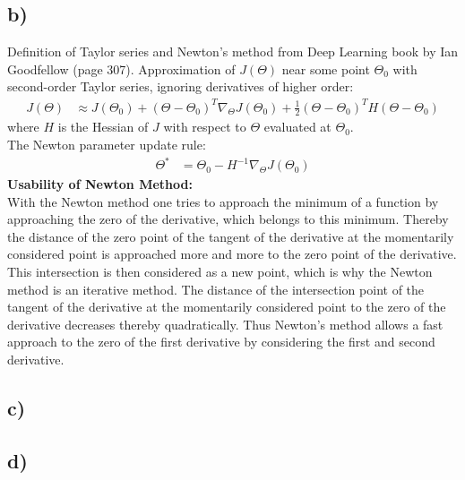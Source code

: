 \documentclass[a4paper]{article}
\begin{document}
    \subsection*{b)}
        Definition of Taylor series and Newton's method from Deep Learning book by Ian Goodfellow (page 307).
        Approximation of $J(\Theta)$ near some point $\Theta_0$ with second-order Taylor series, ignoring derivatives of higher order:
        \begin{align}
            J(\Theta) &\approx J(\Theta_0) + (\Theta - \Theta_0)^T \nabla_{\Theta} J(\Theta_0) + \frac{1}{2} (\Theta - \Theta_0)^T H(\Theta - \Theta_0)
        \end{align}
        where $H$ is the Hessian of $J$ with respect to $\Theta$ evaluated at $\Theta_0$.\\
        The Newton parameter update rule:
        \begin{align}
            \Theta^* &= \Theta_0 - H^{-1} \nabla_{\Theta} J(\Theta_0)
        \end{align}
        \textbf{Usability of Newton Method:}\\
        With the Newton method one tries to approach the minimum of a function by approaching the zero of the derivative, which belongs to this minimum.
        Thereby the distance of the zero point of the tangent of the derivative at the momentarily considered point is approached more and more to the zero point of the derivative.
        This intersection is then considered as a new point, which is why the Newton method is an iterative method.
        The distance of the intersection point of the tangent of the derivative at the momentarily considered point to the zero of the derivative decreases thereby quadratically.
        Thus Newton's method allows a fast approach to the zero of the first derivative by considering the first and second derivative.

    
    \subsection*{c)}
        


    \subsection*{d)}
        
\end{document}
